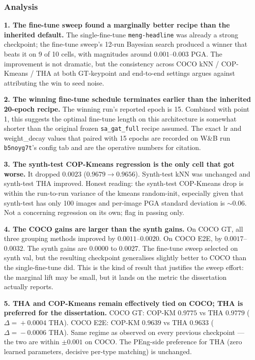 \subsubsection{Analysis}

\textbf{1. The fine-tune sweep found a marginally better recipe than the inherited default.} The single-fine-tune \texttt{meng-headline} was already a strong checkpoint; the fine-tune sweep's 12-run Bayesian search produced a winner that beats it on 9 of 10 cells, with magnitudes around $0.001$--$0.003$ PGA. The improvement is not dramatic, but the consistency across COCO kNN / COP-Kmeans / THA at both GT-keypoint and end-to-end settings argues against attributing the win to seed noise.

\textbf{2. The winning fine-tune schedule terminates earlier than the inherited 20-epoch recipe.} The winning run's reported epoch is 15. Combined with point 1, this suggests the optimal fine-tune length on this architecture is somewhat shorter than the original frozen \texttt{sa\_gat\_full} recipe assumed. The exact lr and weight\_decay values that paired with 15 epochs are recorded on W\&B run \texttt{b5noyg7t}'s config tab and are the operative numbers for citation.

\textbf{3. The synth-test COP-Kmeans regression is the only cell that got worse.} It dropped $0.0023$ ($0.9679 \rightarrow 0.9656$). Synth-test kNN was unchanged and synth-test THA improved. Honest reading: the synth-test COP-Kmeans drop is within the run-to-run variance of the kmeans random-init, especially given that synth-test has only 100 images and per-image PGA standard deviation is $\sim 0.06$. Not a concerning regression on its own; flag in passing only.

\textbf{4. The COCO gains are larger than the synth gains.} On COCO GT, all three grouping methods improved by $0.0011$--$0.0020$. On COCO E2E, by $0.0017$--$0.0032$. The synth gains are $0.0000$ to $0.0027$. The fine-tune sweep selected on synth val, but the resulting checkpoint generalises slightly better to COCO than the single-fine-tune did. This is the kind of result that justifies the sweep effort: the marginal lift may be small, but it lands on the metric the dissertation actually reports.

\textbf{5. THA and COP-Kmeans remain effectively tied on COCO; THA is preferred for the dissertation.} COCO GT: COP-KM $0.9775$ vs THA $0.9779$ ($\Delta\!=\!+0.0004$ THA). COCO E2E: COP-KM $0.9639$ vs THA $0.9633$ ($\Delta\!=\!-0.0006$ THA). Same regime as observed on every previous checkpoint --- the two are within $\pm 0.001$ on COCO. The PEng-side preference for THA (zero learned parameters, decisive per-type matching) is unchanged.

